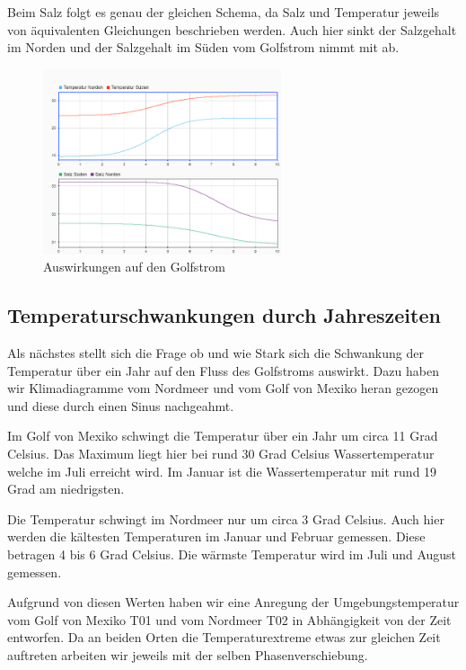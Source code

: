 \documentclass[a4paper,twoside]{article}
\begin{document}
	Beim Salz folgt es genau der gleichen Schema, da Salz und Temperatur jeweils von äquivalenten Gleichungen beschrieben werden. Auch hier sinkt der Salzgehalt im Norden und der Salzgehalt im Süden vom Golfstrom nimmt mit ab.

	\begin{figure}[!h]
  		\centering
 		\includegraphics[width=7cm]{../Diagramme/Arktis_schmiltz_werte.png}
  		\caption{Auswirkungen auf den Golfstrom}
  		\label{fig:schmilztGolf}
	\end{figure}

	\subsection{Temperaturschwankungen durch Jahreszeiten} \label{TempDurchJahreszeiten}
	
	Als nächstes stellt sich die Frage ob und wie Stark sich die Schwankung der Temperatur über ein Jahr auf den Fluss des Golfstroms auswirkt. Dazu haben wir Klimadiagramme vom Nordmeer und vom Golf von Mexiko heran gezogen und diese durch einen Sinus nachgeahmt. 
	
	Im Golf von Mexiko schwingt die Temperatur über ein Jahr um circa 11 Grad Celsius. Das Maximum liegt hier bei rund 30 Grad Celsius Wassertemperatur welche im Juli erreicht wird. Im Januar ist die Wassertemperatur mit rund 19 Grad am niedrigsten.
	
	Die Temperatur schwingt im Nordmeer nur um circa 3 Grad Celsius. Auch hier werden die kältesten Temperaturen im Januar und Februar gemessen. Diese betragen 4 bis 6 Grad Celsius. Die wärmste Temperatur wird im Juli und August gemessen. 
	
	Aufgrund von diesen Werten haben wir eine Anregung der Umgebungstemperatur vom Golf von Mexiko T01 und vom Nordmeer T02 in Abhängigkeit von der Zeit entworfen. Da an beiden Orten die Temperaturextreme etwas zur gleichen Zeit auftreten arbeiten wir jeweils mit der selben Phasenverschiebung. 
	
\end{document}
